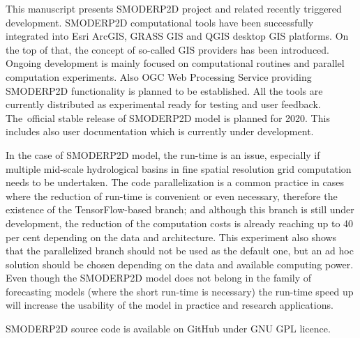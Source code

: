 This manuscript presents SMODERP2D project and related recently
triggered development. SMODERP2D computational tools have been
successfully integrated into Esri ArcGIS, GRASS GIS and QGIS desktop
GIS platforms. On the top of that, the concept of so-called GIS providers
has been introduced. Ongoing development is mainly focused on
computational routines and parallel computation experiments. Also OGC
Web Processing Service providing SMODERP2D functionality is planned to
be established. All the tools are currently distributed as
experimental ready for testing and user feedback. The~official stable
release of SMODERP2D model is planned for 2020. This includes also
user documentation which is currently under development.

In the case of SMODERP2D model, the run-time is an issue, especially
if multiple mid-scale hydrological basins in fine spatial resolution
grid computation needs to be undertaken. The code parallelization is a
common practice in cases where the reduction of run-time is convenient
or even necessary, therefore the existence of the TensorFlow-based
branch; and although this branch is still under development, the
reduction of the computation costs is already reaching up to 40
per cent depending on the data and architecture. This experiment also
shows that the parallelized branch should not be used as the default
one, but an ad hoc solution should be chosen depending on the data and
available computing power. Even though the SMODERP2D model does not
belong in the family of forecasting models (where the short run-time
is necessary) the run-time speed up will increase the usability of the
model in practice and research applications.

SMODERP2D source code is available on GitHub
\cite{smoderp2d-github-2019} under GNU GPL licence. 
